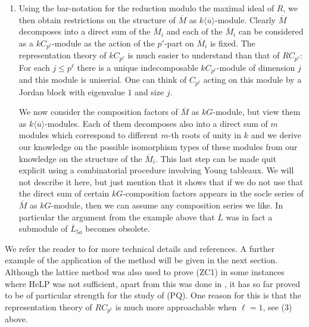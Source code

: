 \documentclass[10pt,a4paper,reqno]{amsart}
\theoremstyle{definition}
\theoremstyle{remark}
\begin{document}
\begin{enumerate}
Now to get more restrictions on the isomorphism type of the $M_i$ one needs to study $RC_{p^\ell}$-modules. This is in general a wild problem, but when $\ell = 1$ and $p$ is unramified in $R$, then this can be done generically. Note that this is exactly the case in the example above. In general the bigger $\ell$ is and the more $p$ ramifies in $R$, the harder it is to describe the representation theory of $RC_{p^\ell}$. This explains our choice of $R$.

\item Using the bar-notation for the reduction modulo the maximal ideal of $R$, we then obtain restrictions on the structure of $\overline{M}$ as $k \langle \overline{u} \rangle$-module. Clearly $\overline{M}$ decomposes into a direct sum of the $\overline{M}_i$ and each of the $\overline{M}_i$ can be considered as a $kC_{p^\ell}$-module as the action of the $p'$-part on $\overline{M}_i$ is fixed. The representation theory of $kC_{p^\ell}$ is much easier to understand than that of $RC_{p^\ell}$: For each $j \leqslant p^\ell$ there is a unique indecomposable $kC_{p^\ell}$-module of dimension $j$ and this module is uniserial. One can think of $C_{p^\ell}$ acting on this module by a Jordan block with eigenvalue $1$ and size $j$. 

We now consider the composition factors of $\overline{M}$ as $kG$-module, but view them as $k \langle \overline{u}\rangle$-modules. Each of them decomposes also into a direct sum of $m$ modules which correspond to different $m$-th roots of unity in $k$ and we derive our knowledge on the possible isomorphism types of these modules from our knowledge on the structure of the $\overline{M}_i$. This last step can be made quit explicit using a combinatorial procedure involving Young tableaux. We will not describe it here, but just mention that it shows that if we do not use that the direct sum of certain $kG$-composition factors appears in the socle series of $\overline{M}$ as $kG$-module, then we can assume any composition series we like. In particular the argument from the example above that $\overline{L}$ was in fact a submodule of $\overline{L}_{5a}$ becomes obsolete.  
\end{enumerate}

We refer the reader to \cite{BM17, 4primaryII} for more technical details and references. A further example of the application of the method will be given in the next section. 
Although the lattice method was also used to prove (ZC1) in some instances where HeLP was not sufficient, apart from \cite{HertweckA6} this was done in \cite{BM17, 4primaryII}, it has so far proved to be of particular strength for the study of (PQ). One reason for this is that the representation theory of $RC_{p^\ell}$ is much more approachable when $\ell=1$, see (3) above.
\end{document}
